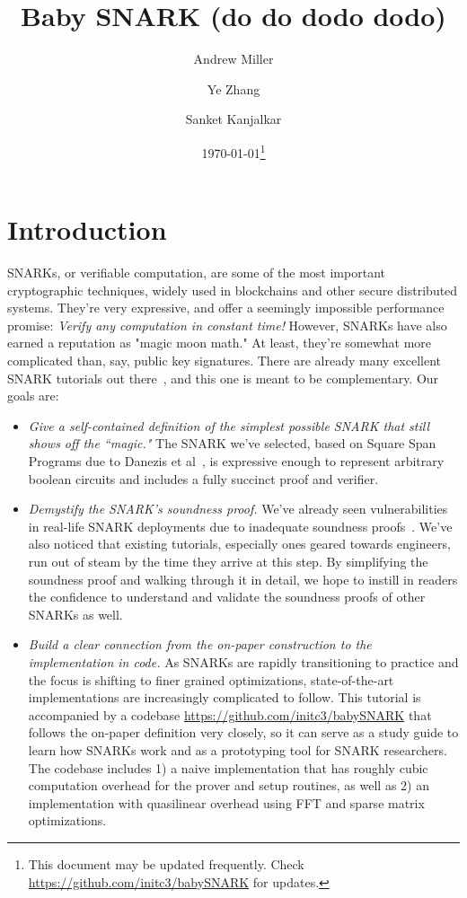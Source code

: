 \documentclass{article}
\title{Baby SNARK (do do dodo dodo)}
\author{Andrew Miller \and Ye Zhang \and Sanket Kanjalkar}
\date{\today\footnote{This document may be updated frequently. Check \url{https://github.com/initc3/babySNARK} for updates.}}
\theoremstyle{definition}
\theoremstyle{remark}
\begin{document}
\maketitle

\section{Introduction}



SNARKs, or verifiable computation, are some of the most important cryptographic techniques, widely used in blockchains and other secure distributed systems. They're very expressive, and offer a seemingly impossible performance promise: \emph{Verify any computation in constant time!}
However, SNARKs have also earned a reputation as "magic moon math." At least, they're somewhat more complicated than, say, public key signatures.
%
There are already many excellent SNARK tutorials out there~\cite{nitulescugentle,petkus2019and}, and this one is meant to be complementary. Our goals are:
\begin{itemize}
    \item \emph{Give a self-contained definition of the simplest possible SNARK that still shows off the ``magic."} The SNARK we've selected, based on Square Span Programs due to Danezis et al~\cite{squarespan}, is expressive enough to represent arbitrary boolean circuits and includes a fully succinct proof and verifier.
    
    \item \emph{Demystify the SNARK's soundness proof.}
       We've already seen vulnerabilities in real-life SNARK deployments due to inadequate soundness
       proofs~\cite{gabizon2019security,parnounsoundness}.
       We've also noticed that existing tutorials, especially ones geared towards engineers, run out of steam by the time they arrive at this step.
       By simplifying the soundness proof and walking through it in detail, we hope to instill in readers the confidence to understand and validate the soundness proofs of other SNARKs as well. 
    
    \item \emph{Build a clear connection from the on-paper construction to the implementation in code.}
       As SNARKs are rapidly transitioning to practice and the focus is shifting to finer grained optimizations, state-of-the-art implementations are increasingly complicated to follow.
       This tutorial is accompanied by a codebase \url{https://github.com/initc3/babySNARK}
       that follows the on-paper definition very closely, so it can serve as a study guide to learn how SNARKs work and as a prototyping tool for SNARK researchers.
       The codebase includes 1) a naive implementation that has roughly cubic computation overhead for the prover and setup routines, as well as 2) an implementation with quasilinear overhead using FFT and sparse matrix optimizations.

\end{itemize}
\end{document}
